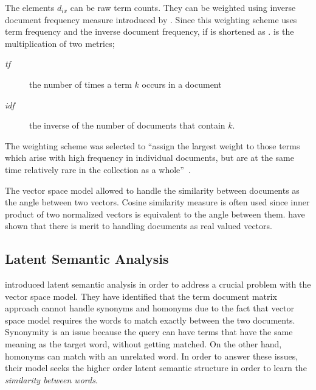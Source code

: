 The elements $d_{ix}$ can be raw term counts.
They can be weighted using inverse document frequency measure introduced by \textcite{jones_statistical_1972}.
Since this weighting scheme uses term frequency and the inverse document frequency, if is shortened as \tfidf{}.
\tfidf{} is the multiplication of two metrics;
\begin{description}
    \item[\emph{tf}] the number of times a term $k$ occurs in a document
    \item[\emph{idf}] the inverse of the number of documents that contain $k$.
\end{description}

The weighting scheme was selected to \enquote{assign the largest weight to those terms which arise with high frequency in individual documents, but are at the same time relatively rare in the collection as a whole}~\cite{salton_vector_1975}.

The vector space model allowed \citeauthor{salton_vector_1975} to handle the similarity between documents as the angle between two vectors.
Cosine similarity measure is often used since inner product of two normalized vectors is equivalent to the angle between them.
\citeauthor{salton_vector_1975} have shown that there is merit to handling documents as real valued vectors.

\subsection{Latent Semantic Analysis}%
\label{sub:latent_semantic_analysis}

\textcite{deerwester_indexing_1990} introduced latent semantic analysis in order to address a crucial problem with the vector space model.
They have identified that the term document matrix approach cannot handle synonyms and homonyms due to the fact that vector space model requires the words to match exactly between the two documents.
Synonymity is an issue because the query can have terms that have the same meaning as the target word, without getting matched.
On the other hand, homonyms can match with an unrelated word.
In order to answer these issues, their model seeks the higher order latent semantic structure in order to learn the \emph{similarity between words}.


